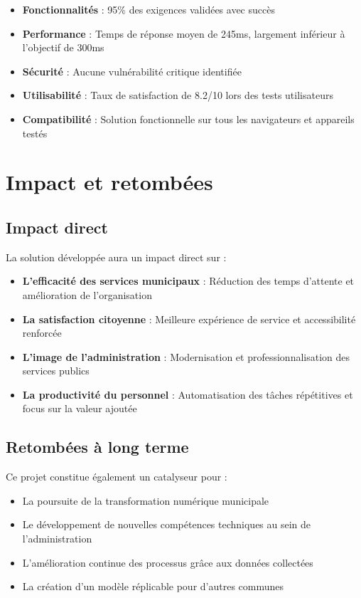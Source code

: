 \begin{itemize}
    \item \textbf{Fonctionnalités} : 95\% des exigences validées avec succès
    \item \textbf{Performance} : Temps de réponse moyen de 245ms, largement inférieur à l'objectif de 300ms
    \item \textbf{Sécurité} : Aucune vulnérabilité critique identifiée
    \item \textbf{Utilisabilité} : Taux de satisfaction de 8.2/10 lors des tests utilisateurs
    \item \textbf{Compatibilité} : Solution fonctionnelle sur tous les navigateurs et appareils testés
\end{itemize}

\section*{Impact et retombées}

\subsection*{Impact direct}

La solution développée aura un impact direct sur :

\begin{itemize}
    \item \textbf{L'efficacité des services municipaux} : Réduction des temps d'attente et amélioration de l'organisation
    \item \textbf{La satisfaction citoyenne} : Meilleure expérience de service et accessibilité renforcée
    \item \textbf{L'image de l'administration} : Modernisation et professionnalisation des services publics
    \item \textbf{La productivité du personnel} : Automatisation des tâches répétitives et focus sur la valeur ajoutée
\end{itemize}

\subsection*{Retombées à long terme}

Ce projet constitue également un catalyseur pour :

\begin{itemize}
    \item La poursuite de la transformation numérique municipale
    \item Le développement de nouvelles compétences techniques au sein de l'administration
    \item L'amélioration continue des processus grâce aux données collectées
    \item La création d'un modèle réplicable pour d'autres communes
\end{itemize}

